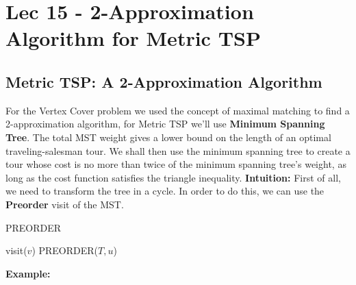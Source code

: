 \chapter{Lec 15 - 2-Approximation Algorithm for Metric TSP}

\section{Metric TSP: A 2-Approximation Algorithm}
For the Vertex Cover problem we used the concept of maximal matching to find a 2-approximation algorithm, for Metric TSP we'll use \textbf{Minimum Spanning Tree}. The total MST weight gives a lower bound on the length of an optimal traveling-salesman tour. We shall then use the minimum spanning tree to create a tour whose cost is no more than twice of the minimum spanning tree’s weight, as long as the cost function satisfies the triangle inequality.\newline\newline
\textbf{Intuition:}
First of all, we need to transform the tree in a cycle. In order to do this, we can use the \textbf{Preorder} visit of the MST.
\begin{algorithm}
\caption{PREORDER}\label{PREORDER}
    \begin{algorithmic}[1]
        \State visit($v$)
                \State PREORDER($T, u$)
            \EndFor
        \EndIf
        \Return
    \EndProcedure   
    \end{algorithmic}
\end{algorithm}\newline\newline
\textbf{Example:}\newline\newline
{}\newline\newline

